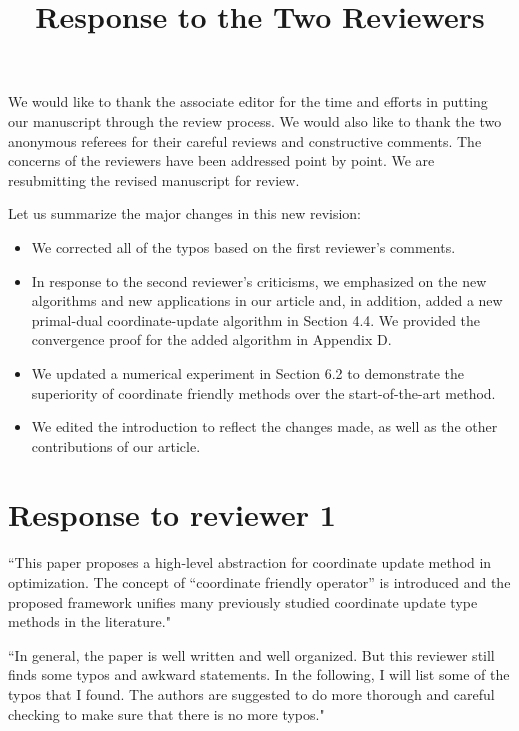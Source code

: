 \documentclass[amsa]{ipart}
\begin{document}
\title{Response to the Two Reviewers}
\vspace{5mm}

We would like to thank the associate editor for the time and efforts in putting our manuscript through the review process. We would also like to thank the two anonymous referees for their careful reviews and constructive comments. The concerns of the reviewers have been addressed point by point. We are resubmitting the revised manuscript for review. 

Let us summarize the major changes in this new revision:
\begin{itemize}
\item We corrected all of the typos based on the first reviewer's comments. 
\item In response to the second reviewer's criticisms, we emphasized on the new algorithms and new applications  in our article and, in addition,  added a new primal-dual coordinate-update algorithm in Section 4.4. We provided the convergence proof for the added algorithm   in Appendix D.
\item We updated a  numerical experiment in Section 6.2 to demonstrate the superiority of coordinate friendly methods over the start-of-the-art method. 
\item We edited the introduction to reflect the changes made, as well as the other contributions of our article.
\end{itemize}

\section{Response to reviewer 1}
``This paper proposes a high-level abstraction for coordinate update method in optimization. The concept of ``coordinate friendly operator'' is introduced and the proposed framework unifies many previously studied coordinate update type methods in the literature."

``In general, the paper is well written and well organized. But this reviewer still finds some typos and awkward statements. In the following, I will list some of the typos that I found. The authors are suggested to do more thorough and careful checking to make sure that there is no more typos."

\end{document}
